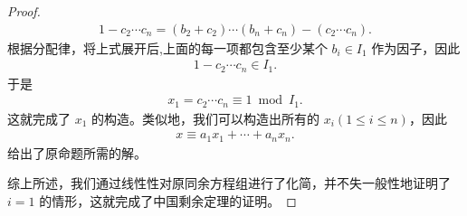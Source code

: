 \documentclass[../../main.tex]{subfiles}
\begin{document}
\begin{proof}
\begin{align*}
1 - c_2 \cdots c_n = (b_2 + c_2) \cdots (b_n + c_n) - (c_2 \cdots c_n) .
\end{align*}
根据分配律，将上式展开后,上面的每一项都包含至少某个 $b_i \in I_1$ 作为因子，因此
\begin{align*}
1 - c_2 \cdots c_n \in I_1 .
\end{align*}
于是
\begin{align*}
x_1 = c_2 \cdots c_n \equiv 1 \bmod I_1 .
\end{align*}
这就完成了 $x_1$ 的构造。类似地，我们可以构造出所有的 $x_i (1 \leqslant i \leqslant n)$，因此
\begin{align*}
x \equiv a_1 x_1 + \cdots + a_n x_n .
\end{align*}
给出了原命题所需的解。

综上所述，我们通过线性性对原同余方程组进行了化简，并不失一般性地证明了 $i = 1$ 的情形，这就完成了中国剩余定理的证明。

\end{proof}
\end{document}
